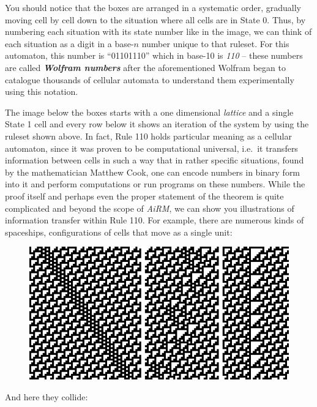 You should notice that the boxes are arranged in a systematic order,
gradually moving cell by cell down to the situation where all cells are
in State 0. Thus, by numbering each situation with its state number like
in the image, we can think of each situation as a digit in a base-\(n\)
number unique to that ruleset. For this automaton, this number is
``01101110'' which in base-10 is \emph{110} -- these numbers are called
\textbf{\emph{Wolfram numbers}} after the aforementioned Wolfram began
to catalogue thousands of cellular automata to understand them
experimentally using this notation.

The image below the boxes starts with a one dimensional \emph{lattice}
and a single State 1 cell and every row below it shows an iteration of
the system by using the ruleset shown above. In fact, Rule 110 holds
particular meaning as a cellular automaton, since it was proven to be
computational universal, i.e.~it transfers information between cells in
such a way that in rather specific situations, found by the
mathematician Matthew Cook, one can encode numbers in binary form into
it and perform computations or run programs on these numbers. While the
proof itself and perhaps even the proper statement of the theorem is
quite complicated and beyond the scope of \emph{AiRM}, we can show you
illustrations of information transfer within Rule 110. For example,
there are numerous kinds of spaceships, configurations of cells that
move as a single unit:

\begin{figure}[htbp]
\centering
\includegraphics{image_1.png}
\caption{}
\end{figure}

And here they collide:

